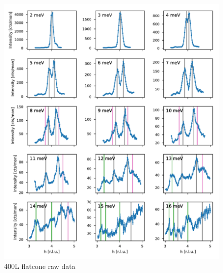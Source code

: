 \begin{figure}
    \centering
    \includegraphics[width=\textwidth]{fig/lowen/fits_400L.pdf}
    \caption[400L flatcone raw data]{400L flatcone raw data}
    \label{fig:flatcone_phonons_400L_raw}    
\end{figure}

